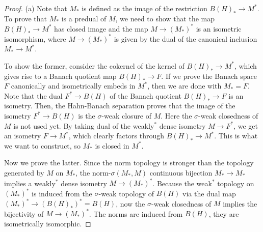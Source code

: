 \documentclass{../../large}
\begin{document}
\begin{proof}
(a)
Note that $M_*$ is defined as the image of the restriction $B(H)_*\to M^*$.
To prove that $M_*$ is a predual of $M$, we need to show that the map $B(H)_*\to M^*$ has closed image and the map $M\to(M_*)^*$ is an isometric isomorphism, where $M\to(M_*)^*$ is given by the dual of the canonical inclusion $M_*\to M^*$.

To show the former, consider the cokernel of the kernel of $B(H)_*\to M^*$, which gives rise to a Banach quotient map $B(H)_*\to F$.
If we prove the Banach space $F$ canonically and isometrically embeds in $M^*$, then we are done with $M_*=F$.
Note that the dual $F^*\to B(H)$ of the Banach quotient $B(H)_*\to F$ is an isometry.
Then, the Hahn-Banach separation proves that the image of the isometry $F^*\to B(H)$ is the $\sigma$-weak closure of $M$.
Here the $\sigma$-weak closedness of $M$ is not used yet.
By taking dual of the weakly$^*$ dense isometry $M\to F^*$, we get an isometry $F\to M^*$, which clearly factors through $B(H)_*\to M^*$.
This is what we want to construct, so $M_*$ is closed in $M^*$.

Now we prove the latter.
Since the norm topology is stronger than the topology generated by $M$ on $M_*$, the norm-$\sigma(M_*,M)$ continuous bijection $M_*\to M_*$ implies a weakly$^*$ dense isometry $M\to(M_*)^*$.
Because the weak$^*$ topology on $(M_*)^*$ is induced from the $\sigma$-weak topology of $B(H)$ via the dual map $(M_*)^*\to(B(H)_*)^*=B(H)$, now the $\sigma$-weak closedness of $M$ implies the bijectivity of $M\to(M_*)^*$.
The norms are induced from $B(H)$, they are isometrically isomorphic.







\end{proof}
\end{document}
